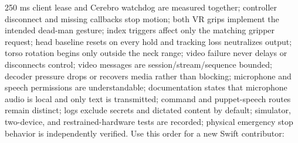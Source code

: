 \markdownRendererUlItem \markdownRendererUntickedBox{} 250 ms client lease and Cerebro watchdog are measured together;\markdownRendererUlItemEnd 
\markdownRendererUlItem \markdownRendererUntickedBox{} controller disconnect and missing callbacks stop motion;\markdownRendererUlItemEnd 
\markdownRendererUlItem \markdownRendererUntickedBox{} both VR grips implement the intended dead-man gesture;\markdownRendererUlItemEnd 
\markdownRendererUlItem \markdownRendererUntickedBox{} index triggers affect only the matching gripper request;\markdownRendererUlItemEnd 
\markdownRendererUlItem \markdownRendererUntickedBox{} head baseline resets on every hold and tracking loss neutralizes output;\markdownRendererUlItemEnd 
\markdownRendererUlItem \markdownRendererUntickedBox{} torso rotation begins only outside the neck range;\markdownRendererUlItemEnd 
\markdownRendererUlItem \markdownRendererUntickedBox{} video failure never delays or disconnects control;\markdownRendererUlItemEnd 
\markdownRendererUlItem \markdownRendererUntickedBox{} video messages are session/stream/sequence bounded;\markdownRendererUlItemEnd 
\markdownRendererUlItem \markdownRendererUntickedBox{} decoder pressure drops or recovers media rather than blocking;\markdownRendererUlItemEnd 
\markdownRendererUlItem \markdownRendererUntickedBox{} microphone and speech permissions are understandable;\markdownRendererUlItemEnd 
\markdownRendererUlItem \markdownRendererUntickedBox{} documentation states that microphone audio is local and only text is transmitted;\markdownRendererUlItemEnd 
\markdownRendererUlItem \markdownRendererUntickedBox{} command and puppet-speech routes remain distinct;\markdownRendererUlItemEnd 
\markdownRendererUlItem \markdownRendererUntickedBox{} logs exclude secrets and dictated content by default;\markdownRendererUlItemEnd 
\markdownRendererUlItem \markdownRendererUntickedBox{} simulator, two-device, and restrained-hardware tests are recorded;\markdownRendererUlItemEnd 
\markdownRendererUlItem \markdownRendererUntickedBox{} physical emergency stop behavior is independently verified.\markdownRendererUlItemEnd 
\markdownRendererUlEnd \markdownRendererInterblockSeparator
{}
\markdownRendererSectionEnd \markdownRendererSectionBegin
{}\markdownRendererInterblockSeparator
{}Use this order for a new Swift contributor:\markdownRendererInterblockSeparator
{}\markdownRendererOlBegin
{}\markdownRendererOlItemEnd 
{}\markdownRendererOlItemEnd 
